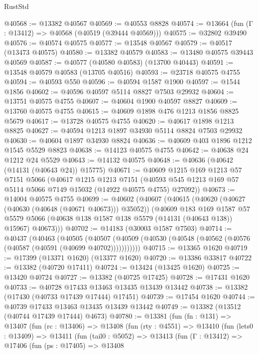\begin{lexlean}{RustStd}
\begin{coremodule}
@40568 := @13382 @40567
@40569 := @40553 @8828
@40574 := @13664 (fun (Γ : @13412) => @40568 (@40519 (@39444 @40569)))
@40575 := @32802 @39490
@40576 := @40574 @40575
@40577 := @13548 @40567
@40579 := @40517 (@13473 @40575)
@40580 := @13382 @40579
@40583 := @13480 @40575 @39443 @40569
@40587 := @40577 (@40580 @40583) (@13700 @40443)
@40591 := @13548 @40579 @40583 (@13705 @40516)
@40593 := @23718 @40575 @4755
@40594 := @40593 @550
@40596 := @40594 @1587 @1900
@40597 := @1544 @1856
@40602 := @40596 @40597 @5114 @8827 @7503 @29932
@40604 := @13751 @40575 @4755
@40607 := @40604 @1900 @40597 @8827
@40609 := @13760 @40575 @4755
@40615 := @40609 @1898 @476 @1213 @1856 @8825 @5679
@40617 := @13728 @40575 @4755
@40620 := @40617 @1898 @1213 @8825
@40627 := @40594 @1213 @1897 @34930 @5114 @8824 @7503 @29932
@40630 := @40604 @1897 @34930 @8824
@40636 := @40609 @403 @1896 @1212 @1545 @5529 @8823
@40638 := @14123 @40575 @4755
@40642 := @40638 @24 @1212 @24 @5529
@40643 := @14132 @40575
@40648 := @40636 (@40642 (@14131 (@40643 @24)) @15775)
@40671 := @40609
    @1215
    @169
    @1213
    @57
    @7151
    @5066
    (@40617
      @1215
      @1213
      @7151
      (@40593 @545 @1213 @169 @57 @5114 @5066 @7149 @15032 (@14922 @40575 @4755) @27092))
@40673 := @14004 @40575 @4755
@40699 := @40602
    (@40607
      (@40615
        (@40620 (@40627 (@40630 (@40648 (@40671 @40673))) @35052))
        (@40609
          @183
          @169
          @1587
          @57
          @5579
          @5066
          (@40638 @138 @1587 @138 @5579 (@14131 (@40643 @138)) @15967)
          @40673)))
@40702 := @14183 (@30003 @1587 @7503)
@40714 := @40437
    (@40463
      (@40505
        (@40507 (@40509 (@40530 (@40548 (@40562 (@40576 (@40587 (@40591 (@40699 @40702)))))))))))
@40715 := @13365 @1620
@40719 := @17399 (@13371 @1620) (@13377 @1620)
@40720 := @13386 @33817
@40722 := @13382 (@40720 @17411)
@40724 := @13424 (@13425 @1620)
@40725 := @13420 @40724
@40727 := @13382 (@40725 @17425)
@40728 := @17431 @1620
@40733 := @40728 @17433 @13463 @13435 @13439 @13442
@40738 := @13382 (@17430 (@40733 @17439 @17444) @17451)
@40739 := @17454 @1620
@40744 := @40739 @17433 @13463 @13435 @13439 @13442
@40749 := @13382 (@13512 (@40744 @17439 @17444) @4673)
@40780 := @13381
    (fun (fn : @131) =>
    @13407
      (fun (rc : @13406) =>
      @13408
        (fun (rty : @4551) =>
        @13410
          (fun (lets0 : @13409) =>
          @13411
            (fun (tail0 : @5052) =>
            @13413
              (fun (Γ : @13412) =>
              @17406
                (fun (ps : @17405) =>
                @13408

\end{coremodule}
\end{lexlean}
